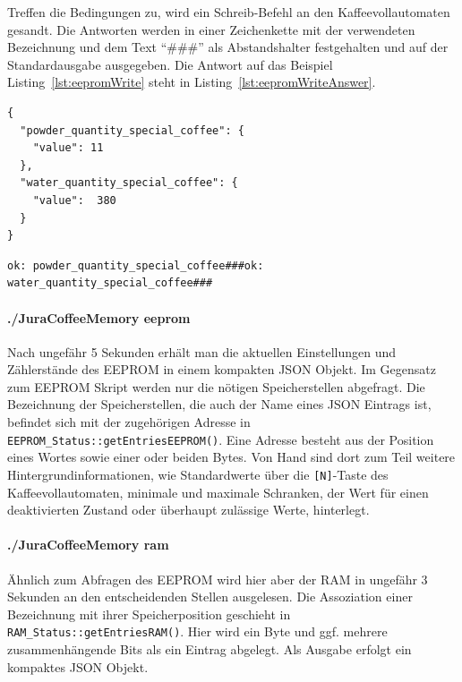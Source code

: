 Treffen die Bedingungen zu, wird ein Schreib-Befehl an den Kaffeevollautomaten gesandt.
Die Antworten werden in einer Zeichenkette mit der verwendeten Bezeichnung und dem Text "`\#\#\#"' als Abstandshalter festgehalten und auf der Standardausgabe ausgegeben.
Die Antwort auf das Beispiel Listing~\ref{lst:eepromWrite} steht in Listing~\ref{lst:eepromWriteAnswer}.

\begin{lstlisting}[label=lst:eepromWrite,caption={Beispiel einer JSON Eingabe für./JuraCoffeeMemory eepromWrite}]
{
  "powder_quantity_special_coffee": {
    "value": 11
  },
  "water_quantity_special_coffee": {
    "value":  380
  }
}
\end{lstlisting}

\begin{lstlisting}[label=lst:eepromWriteAnswer,caption={Antwort auf das Beispiel der JSON Eingabe}]
ok: powder_quantity_special_coffee###ok: water_quantity_special_coffee###
\end{lstlisting}

\paragraph{./JuraCoffeeMemory eeprom}
Nach ungefähr 5 Sekunden erhält man die aktuellen Einstellungen und Zählerstände des \ac{EEPROM} in einem kompakten \ac{JSON} Objekt.
Im Gegensatz zum EEPROM Skript werden nur die nötigen Speicherstellen abgefragt.
Die Bezeichnung der Speicherstellen, die auch der Name eines \ac{JSON} Eintrags ist, befindet sich mit der zugehörigen Adresse in \texttt{EEPROM\_Status::getEntriesEEPROM()}.
Eine Adresse besteht aus der Position eines Wortes sowie einer oder beiden Bytes.
Von Hand sind dort zum Teil weitere Hintergrundinformationen, wie Standardwerte über die \texttt{[N]}-Taste des Kaffeevollautomaten, minimale und maximale Schranken, der Wert für einen deaktivierten Zustand oder überhaupt zulässige Werte, hinterlegt.

\paragraph{./JuraCoffeeMemory ram}
Ähnlich zum Abfragen des \ac{EEPROM} wird hier aber der \ac{RAM} in ungefähr 3 Sekunden an den entscheidenden Stellen ausgelesen.
Die Assoziation einer Bezeichnung mit ihrer Speicherposition geschieht in \texttt{RAM\_Status::getEntriesRAM()}.
Hier wird ein Byte und ggf. mehrere zusammenhängende Bits als ein Eintrag abgelegt.
Als Ausgabe erfolgt ein kompaktes \ac{JSON} Objekt.

